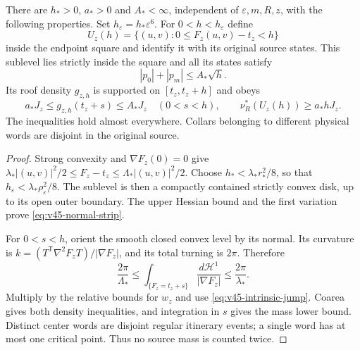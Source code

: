 \begin{proposition}
\label{prop:v45-mass-collar}
There are $h_*>0$, $a_*>0$ and $A_*<\infty$, independent of
$\varepsilon,m,R,z$, with the following properties. Set
$h_\varepsilon=h_*\varepsilon^6$. For $0<h<h_\varepsilon$ define
\[
 U_z(h)=\{(u,v):0\le F_z(u,v)-t_z<h\}
\]
inside the endpoint square and identify it with its original source
states. This sublevel lies strictly inside the square and all its
states satisfy
\begin{equation}\label{eq:v45-normal-strip}
 |p_0|+|p_m|\le A_*\sqrt h.
\end{equation}
Its roof density $g_{z,h}$ is supported on $[t_z,t_z+h]$ and obeys
\begin{equation}\label{eq:v45-collar-density}
 a_* J_z\le g_{z,h}(t_z+s)\le A_* J_z
      \quad(0<s<h),\qquad
 \nu_R^*(U_z(h))\ge a_* hJ_z.
\end{equation}
The inequalities hold almost everywhere. Collars belonging to
different physical words are disjoint in the original source.
\end{proposition}
\begin{proof}
Strong convexity and $\nabla F_z(0)=0$ give
$\lambda_*|(u,v)|^2/2\le F_z-t_z
 \le\Lambda_*|(u,v)|^2/2$.
Choose $h_*<\lambda_*r_*^2/8$, so that
$h_\varepsilon<\lambda_*\rho_\varepsilon^2/8$.
The sublevel is then a compactly contained strictly convex disk, up to
its open outer boundary. The upper Hessian bound and the first
variation prove \eqref{eq:v45-normal-strip}.

For $0<s<h$, orient the smooth closed convex level by its normal.
Its curvature is $k=(T^{\mathsf T}\nabla^2F_zT)/|\nabla F_z|$, and
its total turning is $2\pi$. Therefore
\[
 \frac{2\pi}{\Lambda_*}\le
   \int_{\{F_z=t_z+s\}}\frac{d\mathcal H^1}{|\nabla F_z|}
       \le\frac{2\pi}{\lambda_*}.
\]
Multiply by the relative bounds for $w_z$ and use
\eqref{eq:v45-intrinsic-jump}. Coarea gives both density inequalities,
and integration in $s$ gives the mass lower bound. Distinct center
words are disjoint regular itinerary events; a single word has at
most one critical point. Thus no source mass is counted twice.
\end{proof}
